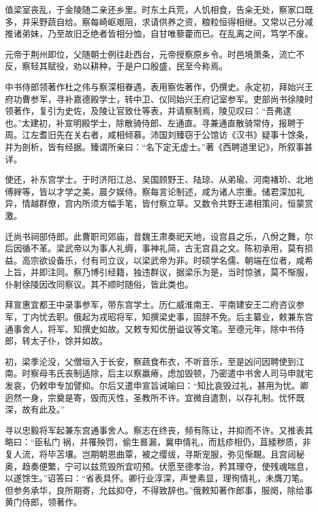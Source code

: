 \documentclass[]{article}
\begin{document}
值梁室丧乱，于金陵随二亲还乡里。时东土兵荒，人饥相食，告籴无处，察家口既多，并采野蔬自给。察每崎岖艰阻，求请供养之资，粮粒恒得相继。又常以己分减推诸弟妹，乃至故旧乏绝者皆相分恤，自甘唯藜藿而已。在乱离之间，笃学不废。

元帝于荆州即位，父随朝士例往赴西台，元帝授察原乡令。时邑境萧条，流亡不反，察轻其赋役，劝以耕种，于是户口殷盛，民至今称焉。

中书侍郎领著作杜之伟与察深相眷遇，表用察佐著作，仍撰史。永定初，拜始兴王府功曹参军，寻补嘉德殿学士，转中卫、仪同始兴王府记室参军。吏部尚书徐陵时领著作，复引为史佐，及陵让官致仕等表，并请察制焉，陵见叹曰：``吾弗逮也。''太建初，补宣明殿学士，除散骑侍郎、左通直。寻兼通直散骑常侍，报聘于周。江左耆旧先在关右者，咸相倾慕。沛国刘臻窃于公馆访《汉书》疑事十馀条，并为剖析，皆有经据。臻谓所亲曰：``名下定无虚士。''著《西聘道里记》，所叙事甚详。

使还，补东宫学士。于时济阳江总、吴国顾野王、陆琼、从弟瑜、河南褚玠、北地傅縡等，皆以才学之美，晨夕娱侍。察每言论制述，咸为诸人宗重。储君深加礼异，情越群僚，宫内所须方幅手笔，皆付察立草。又数令共野王递相策问，恒蒙赏激。

迁尚书祠部侍郎。此曹职司郊庙，昔魏王肃奏祀天地，设宫县之乐，八佾之舞，尔后因循不革。梁武帝以为事人礼缛，事神礼简，古无宫县之文。陈初承用，莫有损益。高宗欲设备乐，付有司立议，以梁武帝为非。时硕学名儒、朝端在位者，咸希上旨，并即注同。察乃博引经籍，独违群议，据梁乐为是，当时惊骇，莫不惭服，仆射徐陵因改同察议。其不顺时随俗，皆此类也。

拜宣惠宜都王中录事参军，带东宫学士。历仁威淮南王、平南建安王二府咨议参军，丁内忧去职。俄起为戎昭将军，知撰梁史事，固辞不免。后主纂业，敕兼东宫通事舍人，将军、知撰史如故。又敕专知优册谥议等文笔。至德元年，除中书侍郎，转太子仆，馀并如故。

初，梁季沦没，父僧垣入于长安，察蔬食布衣，不听音乐，至是凶问因聘使到江南。时察母韦氏丧制适除，后主以察羸瘠，虑加毁顿，乃密遣中书舍人司马申就宅发哀，仍敕申专加譬抑。尔后又遣申宣旨诫喻曰：``知比哀毁过礼，甚用为忧。卿迥然一身，宗奠是寄，毁而灭性，圣教所不许。宜微自遣割，以存礼制。忧怀既深，故有此及。''

寻以忠毅将军起兼东宫通事舍人。察志在终丧，频有陈让，并抑而不许。又推表其略曰：``臣私门祸，并罹殃罚，偷生晷漏，冀申情礼，而尪疹相仍，苴緌秽质，非复人流，将毕苫壤。岂期朝恩曲覃，被之缨绂，寻斯宠服，弥见惭靦。且宫闼秘奥，趋奏便繁，宁可以兹荒毁所宜叨预。伏愿至德孝治，矜其理夺，使残魂喘息，以遂馀生。''诏答曰：``省表具怀。卿行业淳深，声誉素显，理徇情礼，未膺刀笔。但参务承华，良所期寄，允兹抑夺，不得致辞也。''俄敕知著作郎事，服阕，除给事黄门侍郎，领著作。
\end{document}
